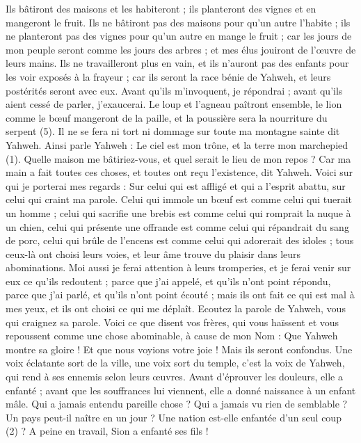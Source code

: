 \begin{multicols}{2}
{Ils bâtiront des maisons et les habiteront ; ils planteront des vignes et en mangeront le fruit.
Ils ne bâtiront pas des maisons pour qu'un autre l’habite ; ils ne planteront pas des vignes pour qu'un autre en mange le fruit ; car les jours de mon peuple seront comme les jours des arbres ; et mes élus jouiront de l’œuvre de leurs mains.
Ils ne travailleront plus en vain, et ils n’auront pas des enfants pour les voir exposés à la frayeur ; car ils seront la race bénie de Yahweh, et leurs postérités seront avec eux.
Avant qu’ils m’invoquent, je répondrai ; avant qu’ils aient cessé de parler, j’exaucerai.
Le loup et l'agneau paîtront ensemble, le lion comme le bœuf mangeront de la paille, et la poussière sera la nourriture du serpent (5). Il ne se fera ni tort ni dommage sur toute ma montagne sainte dit Yahweh.
\VerseOne{}Ainsi parle Yahweh : Le ciel est mon trône, et la terre mon marchepied (1). Quelle maison me bâtiriez-vous, et quel serait le lieu de mon repos ?
Car ma main a fait toutes ces choses, et toutes ont reçu l’existence, dit Yahweh. Voici sur qui je porterai mes regards : Sur celui qui est affligé et qui a l'esprit abattu, sur celui qui craint ma parole.
Celui qui immole un bœuf est comme celui qui tuerait un homme ; celui qui sacrifie une brebis est comme celui qui romprait la nuque à un chien, celui qui présente une offrande est comme celui qui répandrait du sang de porc, celui qui brûle de l’encens est comme celui qui adorerait des idoles ; tous ceux-là ont choisi leurs voies, et leur âme trouve du plaisir dans leurs abominations.
Moi aussi je ferai attention à leurs tromperies, et je ferai venir sur eux ce qu’ils redoutent ; parce que j'ai appelé, et qu'ils n’ont point répondu, parce que j'ai parlé, et qu'ils n'ont point écouté ; mais ils ont fait ce qui est mal à mes yeux, et ils ont choisi ce qui me déplaît.
Ecoutez la parole de Yahweh, vous qui craignez sa parole. Voici ce que disent vos frères, qui vous haïssent et vous repoussent comme une chose abominable, à cause de mon Nom : Que Yahweh montre sa gloire ! Et que nous voyions votre joie ! Mais ils seront confondus.
Une voix éclatante sort de la ville, une voix sort du temple, c’est la voix de Yahweh, qui rend à ses ennemis selon leurs œuvres.
Avant d’éprouver les douleurs, elle a enfanté ; avant que les souffrances lui viennent, elle a donné naissance à un enfant mâle.
Qui a jamais entendu pareille chose ? Qui a jamais vu rien de semblable ? Un pays peut-il naître en un jour ? Une nation est-elle enfantée d’un seul coup (2) ? A peine en travail, Sion a enfanté ses fils !
}
\end{multicols}
